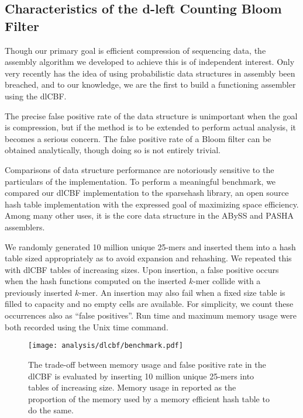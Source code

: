 \documentclass[twocolumn]{article}
\begin{document}
\subsection{Characteristics of the d-left Counting Bloom Filter}

\label{section:dlcbf_results}

Though our primary goal is efficient compression of sequencing data, the
assembly algorithm we developed to achieve this is of independent interest.
Only very recently has the idea of using probabilistic data structures in
assembly been breached, and to our knowledge, we are the first to build
a functioning assembler using the dlCBF.

The precise false positive rate of the data structure is unimportant when the
goal is compression, but if the method is to be extended to perform actual
analysis, it becomes a serious concern. The false positive rate of a Bloom
filter can be obtained analytically, though doing so is not entirely trivial.

Comparisons of data structure performance are notoriously sensitive to the
particulars of the implementation. To perform a meaningful benchmark, we
compared our dlCBF implementation to the sparsehash library, an open source
hash table implementation with the expressed goal of maximizing space
efficiency. Among many other uses, it is the core data structure in the ABySS
\citep{Simpson2011} and PASHA \citep{Liu2011} assemblers.

We randomly generated 10 million unique 25-mers and inserted them into a hash
table sized appropriately as to avoid expansion and rehashing. We repeated
this with dlCBF tables of increasing sizes. Upon insertion, a false positive
occurs when the hash functions computed on the inserted $k$-mer collide with a
previously inserted $k$-mer. An insertion may also fail when a fixed size
table is filled to capacity and no empty cells are available. For simplicity,
we count these occurrences also as ``false positives''. Run time and maximum memory
usage were both recorded using the Unix time command.

\begin{figure}[h]
\centerline{\texttt{[image: analysis/dlcbf/benchmark.pdf]}}
\caption{
The trade-off between memory usage and false positive rate in the dlCBF is
evaluated by inserting 10 million unique 25-mers into tables of increasing
size. Memory usage in reported as the proportion of the memory used by a
memory efficient hash table to do the same.
}
\label{fig:dlcbf_bench}
\end{figure}
\end{document}
